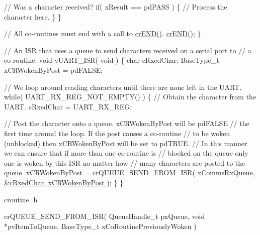 \begin{DoxyPre}      // Was a character received?
      if( xResult == pdPASS )
      \{
          // Process the character here.
      \}
  \}\end{DoxyPre}



\begin{DoxyPre}  // All co-routines must end with a call to \hyperlink{vendor_2ceedling_2plugins_2freertos_2src_2freertos_2include_2croutine_8h_ae6038cc976689b50000475ebfc4e2f23}{crEND()}.
  \hyperlink{vendor_2ceedling_2plugins_2freertos_2src_2freertos_2include_2croutine_8h_ae6038cc976689b50000475ebfc4e2f23}{crEND()};
\}\end{DoxyPre}



\begin{DoxyPre}// An ISR that uses a queue to send characters received on a serial port to
// a co-routine.
void vUART\_ISR( void )
\{
char cRxedChar;
BaseType\_t xCRWokenByPost = pdFALSE;\end{DoxyPre}



\begin{DoxyPre}  // We loop around reading characters until there are none left in the UART.
  while( UART\_RX\_REG\_NOT\_EMPTY() )
  \{
      // Obtain the character from the UART.
      cRxedChar = UART\_RX\_REG;\end{DoxyPre}



\begin{DoxyPre}      // Post the character onto a queue.  xCRWokenByPost will be pdFALSE
      // the first time around the loop.  If the post causes a co-routine
      // to be woken (unblocked) then xCRWokenByPost will be set to pdTRUE.
      // In this manner we can ensure that if more than one co-routine is
      // blocked on the queue only one is woken by this ISR no matter how
      // many characters are posted to the queue.
      xCRWokenByPost = \hyperlink{vendor_2ceedling_2plugins_2freertos_2src_2freertos_2include_2croutine_8h_ac8eb0a81c5cf69de7e4edd73ce44a3be}{crQUEUE\_SEND\_FROM\_ISR( xCommsRxQueue, &cRxedChar, xCRWokenByPost )};
  \}
\}
\end{DoxyPre}


croutine. h 
\begin{DoxyPre}
 crQUEUE\_SEND\_FROM\_ISR(
                           QueueHandle\_t pxQueue,
                           void *pvItemToQueue,
                           BaseType\_t xCoRoutinePreviouslyWoken
                      )\end{DoxyPre}


